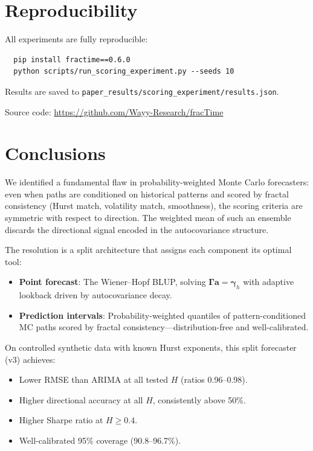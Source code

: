 \documentclass[12pt,a4paper]{article}
\begin{document}
\section{Reproducibility}
\label{sec:reproducibility}

All experiments are fully reproducible:
\begin{verbatim}
  pip install fractime==0.6.0
  python scripts/run_scoring_experiment.py --seeds 10
\end{verbatim}
Results are saved to
\texttt{paper\_results/scoring\_experiment/results.json}.

\noindent Source code:
\url{https://github.com/Wayy-Research/fracTime}

\section{Conclusions}
\label{sec:conclusions}

We identified a fundamental flaw in probability-weighted Monte Carlo
forecasters: even when paths are conditioned on historical patterns and
scored by fractal consistency (Hurst match, volatility match, smoothness),
the scoring criteria are symmetric with respect to direction.  The weighted
mean of such an ensemble discards the directional signal encoded in the
autocovariance structure.

The resolution is a split architecture that assigns each component its
optimal tool:
\begin{itemize}
  \item \textbf{Point forecast}: The Wiener--Hopf BLUP, solving
        $\boldsymbol{\Gamma}\mathbf{a} = \boldsymbol{\gamma}_h$ with
        adaptive lookback driven by autocovariance decay.
  \item \textbf{Prediction intervals}: Probability-weighted quantiles of
        pattern-conditioned MC paths scored by fractal consistency---distribution-free
        and well-calibrated.
\end{itemize}

On controlled synthetic data with known Hurst exponents, this split
forecaster (v3) achieves:
\begin{itemize}
  \item Lower RMSE than ARIMA at all tested $H$ (ratios 0.96--0.98).
  \item Higher directional accuracy at all $H$, consistently above 50\%.
  \item Higher Sharpe ratio at $H \geq 0.4$.
  \item Well-calibrated 95\% coverage (90.8--96.7\%).
\end{itemize}
\end{document}
